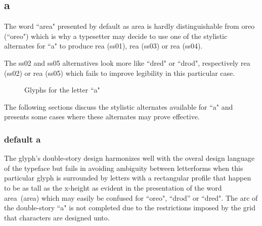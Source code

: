 \subsection{a}

The word ``area" presented by default as {\ssdefault area} is hardly
distinguishable from {\ssdefault oreo} (``oreo") which is why a typesetter may
decide to use one of the stylistic alternates for ``a" to produce
{re{\ssone a}} (ss01),
{re{\ssthree a}} (ss03) or
{re{\ssfour a}} (ss04).

The ss02 and ss05 alternatives look more like ``dred" or ``drod", respectively
{re{\sstwo a}} (ss02) or
{re{\ssfive a}} (ss05)
which fails to improve legibility in this particular case.

\begin{figure}[!h]
  \caption{Glyphs for the letter ``a"}
  \label{fig:glyphs-a}
  \centering
\end{figure}

The following sections discuss the stylistic alternates available for ``a" and
presents some cases where these alternates may prove effective.

\subsubsection{default {\ssdefault a}}

The glyph's double-story design harmonizes well with the overal design
language of the typeface but fails in avoiding ambiguity between letterforms
when this particular glyph is surrounded by letters with a rectangular profile
that happen to be as tall as the x-height as evident in the presentation of the
word \mbox{{\ssdefault area} (area)} which may easily be confused for ``oreo",
``drod'' or ``dred". The arc of the double-story ``a" is not completed due to
the restrictions imposed by the grid that characters are designed unto.

